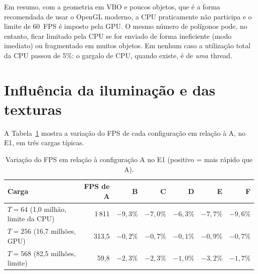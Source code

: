 \documentclass[12pt,a4paper]{article}
\begin{document}
Em resumo, com a geometria em VBO e poucos objetos, que é a forma recomendada de usar o OpenGL
moderno, a CPU praticamente não participa e o limite de 60~FPS é imposto pela GPU. O mesmo número de
polígonos pode, no entanto, ficar limitado pela CPU se for enviado de forma ineficiente (modo
imediato) ou fragmentado em muitos objetos. Em nenhum caso a utilização total da CPU passou de
5\%: o gargalo de CPU, quando existe, é de \emph{uma} thread.

\section{Influência da iluminação e das texturas}
\label{sec:luz_textura}

A Tabela~\ref{tab:luz_textura} mostra a variação do FPS de cada configuração em relação à A, no
E1, em três cargas típicas.

\begin{table}[H]
\centering
\caption{Variação do FPS em relação à configuração A no E1 (positivo = mais rápido que A).}
\label{tab:luz_textura}
\footnotesize
\begin{tabular}{l r r r r r r}
\toprule
Carga & FPS de A & B & C & D & E & F \\
\midrule
$T=64$ (1,0 milhão, limite da CPU) & 1\,811 & $-9{,}3\%$ & $-7{,}0\%$ & $-6{,}3\%$ & $-7{,}7\%$ & $-9{,}6\%$ \\
$T=256$ (16,7 milhões, GPU) & 313,5 & $-0{,}2\%$ & $-0{,}7\%$ & $-0{,}1\%$ & $-0{,}9\%$ & $-0{,}7\%$ \\
$T=568$ (82,5 milhões, limite) & 59,8 & $-2{,}3\%$ & $-2{,}3\%$ & $-1{,}0\%$ & $-3{,}2\%$ & $-1{,}7\%$ \\
\bottomrule
\end{tabular}
\end{table}
\end{document}
